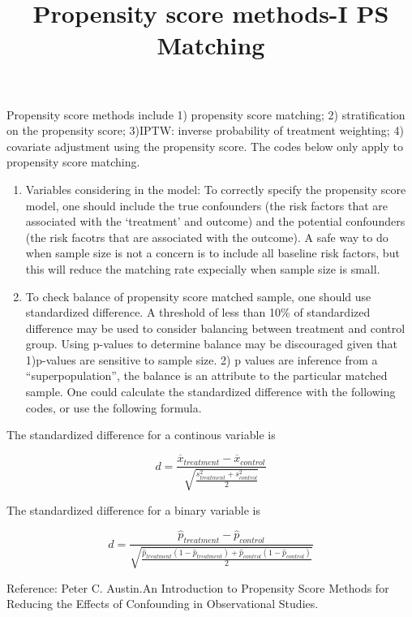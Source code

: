 \documentclass[]{article}
\title{Propensity score methods-I PS Matching}
\date{}
\begin{document}
\maketitle

Propensity score methods include 1) propensity score matching; 2)
stratification on the propensity score; 3)IPTW: inverse probability of
treatment weighting; 4) covariate adjustment using the propensity score.
The codes below only apply to propensity score matching.

\begin{enumerate}
\def\labelenumi{\arabic{enumi}.}
\item
  Variables considering in the model: To correctly specify the
  propensity score model, one should include the true confounders (the
  risk factors that are associated with the `treatment' and outcome) and
  the potential confounders (the risk facotrs that are associated with
  the outcome). A safe way to do when sample size is not a concern is to
  include all baseline risk factors, but this will reduce the matching
  rate expecially when sample size is small.
\item
  To check balance of propensity score matched sample, one should use
  standardized difference. A threshold of less than 10\% of standardized
  difference may be used to consider balancing between treatment and
  control group. Using p-values to determine balance may be discouraged
  given that 1)p-values are sensitive to sample size. 2) p values are
  inference from a ``superpopulation'', the balance is an attribute to
  the particular matched sample. One could calculate the standardized
  difference with the following codes, or use the following formula.
\end{enumerate}

The standardized difference for a continous variable is

\[ d= \frac {\overline{x}_{treatment}-\overline{x}_{control}}{\sqrt {\frac{s^2_{treatment}+s^2_{control}}{2}}} \]

The standardized difference for a binary variable is

\[ d=\frac {\hat{p}_{treatment}-\hat{p}_{control}}{\sqrt {\frac{\hat{p}_{treatment} (1-\hat{p}_{treatment})+ \hat{p}_{control} (1-\hat{p}_{control})}{2}}} \]

Reference: Peter C. Austin.An Introduction to Propensity Score Methods
for Reducing the Effects of Confounding in Observational Studies.
\end{document}
